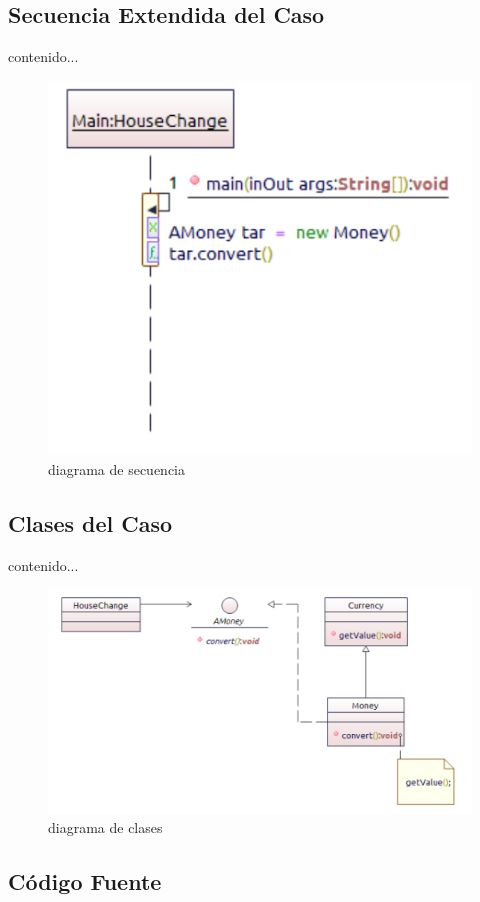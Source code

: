 \subsection{Secuencia Extendida del Caso}
contenido...
\begin{figure}[th!]
	\centering
	\includegraphics[width=0.7\linewidth]{arquitectura_diseno/imgs/CSE_Adaptador}
	\caption{diagrama de secuencia}
\end{figure}
\newpage
\subsection{Clases  del Caso}
contenido...
\begin{figure}[th!]
	\centering
	\includegraphics[width=0.7\linewidth]{arquitectura_diseno/imgs/CCL_Adaptador}
	\caption{diagrama de clases}
\end{figure}
\newpage
\subsection{Código Fuente}
%
%
%
%
